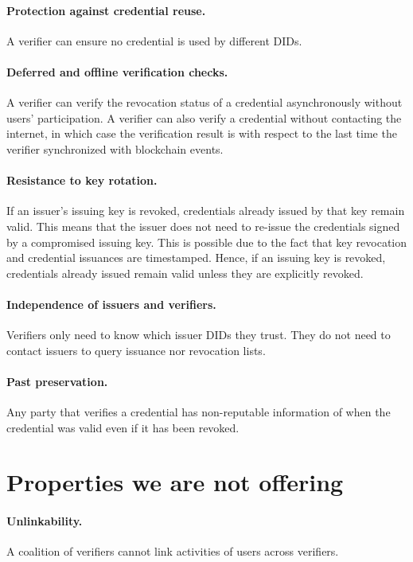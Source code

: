 \documentclass[10pt,a4paper]{article}
\begin{document}
\paragraph{Protection against credential reuse.} A verifier can ensure no credential is used by different DIDs. 
\paragraph{Deferred and offline verification checks.} A verifier can verify the revocation status of a credential asynchronously without users’ participation. A verifier can also verify a credential without contacting the internet, in which case the verification result is with respect to the last time the verifier synchronized with blockchain events.
\paragraph{Resistance to key rotation.} If an issuer's issuing key is revoked, credentials already issued by that key remain valid. This means that the issuer does not need to re-issue the credentials signed by a compromised issuing key. This is possible due to the fact that key revocation and credential issuances are timestamped. Hence, if an issuing key is revoked, credentials already issued remain valid unless they are explicitly revoked.
\paragraph{Independence of issuers and verifiers.} Verifiers only need to know which issuer DIDs they trust. They do not need to contact issuers to query issuance nor revocation lists.
\paragraph{Past preservation.} Any party that verifies a credential has non-reputable information of when the credential was valid even if it has been revoked.

\section{Properties we are not offering}

\paragraph{Unlinkability.} A coalition of verifiers cannot link activities of users across verifiers.
\end{document}
